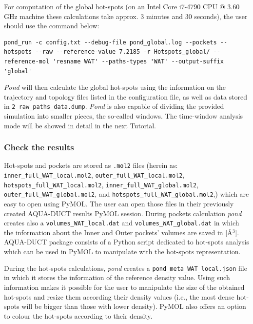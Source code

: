 \documentclass[9pt,tutorial, pubversion]{livecoms}
\begin{document}
For computation of the global hot-spots (on an Intel Core i7-4790 CPU @ 3.60 GHz machine these calculations take approx. 3 minutes and 30 seconds), the user should use the command below:
\begin{lstlisting}[columns=fullflexible]
pond_run -c config.txt --debug-file pond_global.log --pockets --hotspots --raw --reference-value 7.2185 -r Hotspots_global/ --reference-mol 'resname WAT' --paths-types 'WAT' --output-suffix 'global'
\end{lstlisting}
\emph{Pond} will then calculate the global hot-spots using the information on the trajectory and topology files listed in the configuration file, as well as data stored in \texttt{2\_raw\_paths\_data.dump}. 
\emph{Pond} is also capable of dividing the provided simulation into smaller pieces, the so-called windows. The time-window analysis mode will be showed in detail in the next Tutorial.

\subsubsection{Check the results}
Hot-spots and pockets are stored as \texttt{.mol2} files (herein as: \texttt{inner\_full\_WAT\_local.mol2}, \texttt{outer\_full\_WAT\_local.mol2}, \texttt{hotspots\_full\_WAT\_local.mol2}, \newline \texttt{inner\_full\_WAT\_global.mol2}, \texttt{outer\_full\_WAT\_global.mol2}, and \texttt{hotspots\_full\_WAT\_global.mol2},) which are easy to open using PyMOL. The user can open those files in their previously created AQUA-DUCT results PyMOL session. During pockets calculation \emph{pond} creates also a \texttt{volumes\_WAT\_local.dat} and \texttt{volumes\_WAT\_global.dat} in which the information about the Inner and Outer pockets' volumes are saved in [Å\( \displaystyle ^{3}\)]. AQUA-DUCT package consists of a Python script dedicated to hot-spots analysis which can be used in PyMOL to manipulate with the hot-spots representation. 

During the hot-spots calculations, \emph{pond} creates a \texttt{pond\_meta\_WAT\_local.json} file in which it stores the information of the reference density value. Using such information makes it possible for the user to manipulate the size of the obtained hot-spots and resize them according their density values (i.e., the most dense hot-spots will be bigger than those with lower density). PyMOL also offers an option to colour the hot-spots according to their density.
\end{document}
